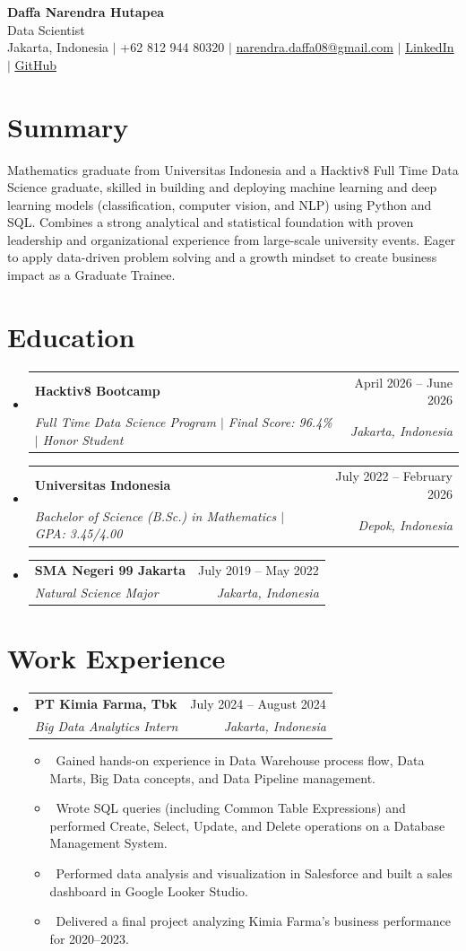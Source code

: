 \documentclass[letterpaper,10pt]{article}
\makeatletter
\newcommand{\resumeItem}[1]{\item\small{#1}}
\newcommand{\resumeSubheading}[4]{
\vspace{-1pt}\item
  \begin{tabular*}{0.97\textwidth}[t]{l@{\extracolsep{\fill}}r}
    \textbf{#1} & #2 \\
    \textit{#3} & \textit{#4} \\
  \end{tabular*}\vspace{-7pt}
}
\newcommand{\resumeSubHeadingList}{\begin{itemize}[leftmargin=0.15in, label={}]}
\newcommand{\resumeSubHeadingListEnd}{\end{itemize}}
\makeatother
\begin{document}
\begin{center}
  \textbf{\Huge Daffa Narendra Hutapea} \\ \vspace{3pt}
  {\large Data Scientist} \\ \vspace{3pt}
  \small Jakarta, Indonesia $|$ +62 812 944 80320 $|$
  \href{mailto:narendra.daffa08@gmail.com}{narendra.daffa08@gmail.com} $|$
  \href{https://linkedin.com/in/daffa-hutapea}{\underline{LinkedIn}} $|$
  \href{https://github.com/daphutapea}{\underline{GitHub}}
\end{center}

\section*{Summary}
Mathematics graduate from Universitas Indonesia and a Hacktiv8 Full Time Data Science graduate, skilled in building and deploying machine learning and deep learning models (classification, computer vision, and NLP) using Python and SQL. Combines a strong analytical and statistical foundation with proven leadership and organizational experience from large-scale university events. Eager to apply data-driven problem solving and a growth mindset to create business impact as a Graduate Trainee.

\section{Education}
\resumeSubHeadingList
  \resumeSubheading
      {Hacktiv8 Bootcamp}{April 2026 -- June 2026}
      {Full Time Data Science Program $|$ Final Score: 96.4\% $|$ Honor Student}{Jakarta, Indonesia}
  \resumeSubheading
      {Universitas Indonesia}{July 2022 -- February 2026}
      {Bachelor of Science (B.Sc.) in Mathematics $|$ GPA: 3.45/4.00}{Depok, Indonesia}
  \resumeSubheading
      {SMA Negeri 99 Jakarta}{July 2019 -- May 2022}
      {Natural Science Major}{Jakarta, Indonesia}
\resumeSubHeadingListEnd

\section{Work Experience}
\resumeSubHeadingList
  \resumeSubheading
      {PT Kimia Farma, Tbk}{July 2024 -- August 2024}
      {Big Data Analytics Intern}{Jakarta, Indonesia}
      \resumeSubHeadingList
          \resumeItem{\textbullet\ Gained hands-on experience in Data Warehouse process flow, Data Marts, Big Data concepts, and Data Pipeline management.}
          \resumeItem{\textbullet\ Wrote SQL queries (including Common Table Expressions) and performed Create, Select, Update, and Delete operations on a Database Management System.}
          \resumeItem{\textbullet\ Performed data analysis and visualization in Salesforce and built a sales dashboard in Google Looker Studio.}
          \resumeItem{\textbullet\ Delivered a final project analyzing Kimia Farma's business performance for 2020--2023.}
      \resumeSubHeadingListEnd
\resumeSubHeadingListEnd
\end{document}

